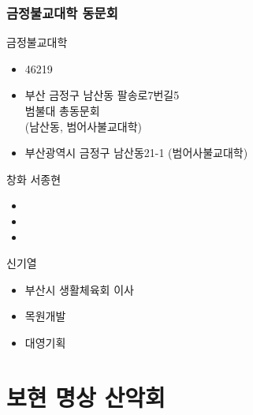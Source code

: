\documentclass[aspectratio=1610,20pt,xcolor=pdftex,dvipsnames,table,handout]{beamer}
\begin{document}
		\begin{frame} [t,plain]
		\frametitle{금정불교대학 동문회}

			\begin{block} {금정불교대학}
			\setlength{\leftmargini}{2em}			
			\begin{itemize}
				\item 46219
				\item 부산 금정구 남산동 팔송로7번길5 \\ 범불대 총동문회 \\(남산동, 범어사불교대학)
				\item 부산광역시 금정구 남산동21-1 (범어사불교대학)
			\end{itemize}
			\end{block}						

			\begin{block} {창화 서종현}
			\setlength{\leftmargini}{2em}			
			\begin{itemize}
				\item
				\item
				\item
			\end{itemize}
			\end{block}						


			\begin{block} {신기열}
			\setlength{\leftmargini}{2em}			
			\begin{itemize}
				\item 부산시 생활체육회 이사
				\item 목원개발
				\item 대영기획
			\end{itemize}
			\end{block}						

		\end{frame}						

		\begin{frame} [t,plain]
		\end{frame}						



		\section{보현 명상 산악회}
\end{document}
